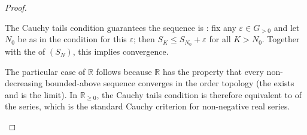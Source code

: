\begin{proof}
\begin{enumerate}
        The Cauchy tails condition guarantees the sequence is : fix any $\varepsilon \in G_{>0}$ and let $N_0$ be as in the condition for this $\varepsilon$; then $S_K \le S_{N_0} + \varepsilon$ for all $K > N_0$. Together with the  of $(S_N)$, this implies convergence.

        The particular case of $\mathbb{R}$ follows because $\mathbb{R}$ has the property that every non-decreasing bounded-above sequence converges in the order topology (the  exists and is the limit). In $\mathbb{R}_{\ge 0}$, the Cauchy tails condition is therefore equivalent to  of the series, which is the standard Cauchy criterion for non-negative real series.
    \end{enumerate}
\end{proof}